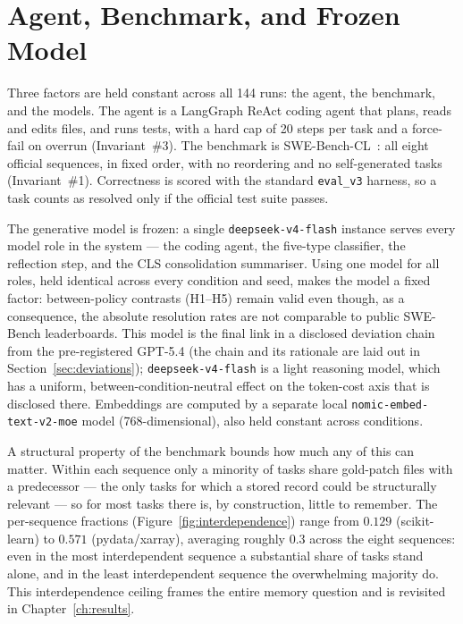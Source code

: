 

\section{Agent, Benchmark, and Frozen Model}

Three factors are held constant across all 144 runs: the agent, the benchmark, and the
models. The agent is a LangGraph ReAct coding agent that plans, reads and edits files, and
runs tests, with a hard cap of 20 steps per task and a force-fail on overrun
(Invariant~\#3). The benchmark is SWE-Bench-CL~\cite{joshi2025}: all eight official
sequences, in fixed order, with no reordering and no self-generated tasks (Invariant~\#1).
Correctness is scored with the standard \texttt{eval\_v3} harness, so a task counts as
resolved only if the official test suite passes.

The generative model is frozen: a single \texttt{deepseek-v4-flash} instance serves every
model role in the system --- the coding agent, the five-type classifier, the reflection
step, and the CLS consolidation summariser. Using one model for all roles, held identical
across every condition and seed, makes the model a fixed factor: between-policy contrasts
(H1--H5) remain valid even though, as a consequence, the absolute resolution rates are not
comparable to public SWE-Bench leaderboards. This model is the final link in a disclosed
deviation chain from the pre-registered GPT-5.4 (the chain and its rationale are laid out in
Section~\ref{sec:deviations}); \texttt{deepseek-v4-flash} is a light reasoning model, which
has a uniform, between-condition-neutral effect on the token-cost axis that is disclosed
there. Embeddings are computed by a separate local \texttt{nomic-embed-text-v2-moe} model
(768-dimensional), also held constant across conditions.

A structural property of the benchmark bounds how much any of this can matter. Within each
sequence only a minority of tasks share gold-patch files with a predecessor --- the only tasks
for which a stored record could be structurally relevant --- so for most tasks there is, by
construction, little to remember. The per-sequence fractions
(Figure~\ref{fig:interdependence}) range from $0.129$ (scikit-learn) to $0.571$
(pydata/xarray), averaging roughly $0.3$ across the eight sequences: even in the most
interdependent sequence a substantial share of tasks stand alone, and in the least
interdependent sequence the overwhelming majority do. This interdependence ceiling frames the
entire memory question and is revisited in Chapter~\ref{ch:results}.

